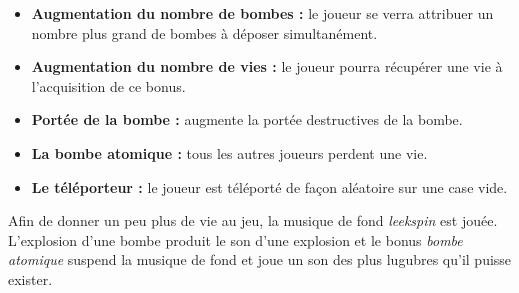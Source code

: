 \begin{itemize}
    \item \textbf{Augmentation du nombre de bombes :} le joueur se verra attribuer un nombre plus grand
     de bombes à déposer simultanément. 
    \item \textbf{Augmentation du nombre de vies :} le joueur pourra récupérer une vie à l'acquisition 
    de ce bonus.
    \item \textbf{Portée de la bombe :} augmente la portée destructives de la bombe.
    \item \textbf{La bombe atomique :} tous les autres joueurs perdent une vie.
    \item \textbf{Le téléporteur :} le joueur est téléporté de façon aléatoire sur une case vide.

\end{itemize}

Afin de donner un peu plus de vie au jeu, la musique de fond \textit{leekspin} est jouée. L'explosion
d'une bombe produit le son d'une explosion et le bonus \textit{bombe atomique} suspend la musique de 
fond et joue un son des plus lugubres qu'il puisse exister.
